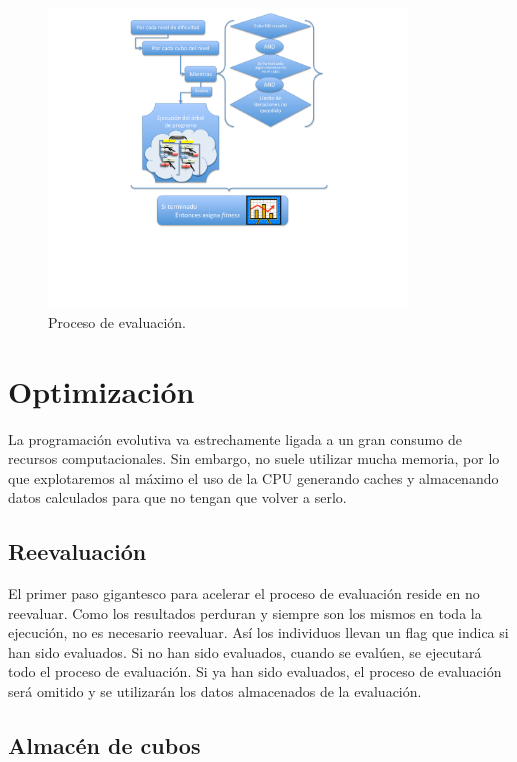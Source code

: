 \begin{figure}[t]
\centering
\includegraphics[width=0.85\textwidth]{figs/pdf/evaluacion}
\caption{Proceso de evaluación.}
\label{fig:evaluacion}
\end{figure}




\section{Optimización}\label{sec:optimizacion}

La programación evolutiva va estrechamente ligada a un gran consumo de recursos
computacionales. Sin embargo, no suele utilizar mucha memoria, por lo que
explotaremos al máximo el uso de la CPU generando caches y almacenando datos
calculados para que no tengan que volver a serlo.


\subsection{Reevaluación}\label{subsec:reevaluacion}

El primer paso gigantesco para acelerar el proceso de evaluación reside en no
reevaluar. Como los resultados perduran y siempre son los mismos en toda la
ejecución, no es necesario reevaluar. Así los individuos llevan un flag que
indica si han sido evaluados. Si no han sido evaluados, cuando se evalúen, se
ejecutará todo el proceso de evaluación. Si ya han sido evaluados, el proceso de
evaluación será omitido y se utilizarán los datos almacenados de la evaluación.

\subsection{Almacén de cubos}\label{subsec:almacen-cubos}

